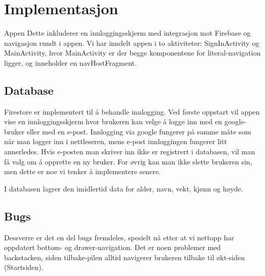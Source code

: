 \section{Implementasjon}

Appen Dette inkluderer en innloggingsskjerm med integrasjon mot Firebase og navigasjon rundt i appen. Vi har inndelt appen i to aktiviteter: SignInActivity og MainActivity, hvor MainActivity er der begge komponentene for literal-navigation ligger, og inneholder en navHostFragment. 

\subsection{Database}
Firestore er implementert til å behandle innlogging. Ved første oppstart vil appen vise en innloggingsskjerm hvor brukeren kan velge å logge inn med en google-bruker eller med en e-post. Innlogging via google fungerer på samme måte som når man logger inn i nettleseren, mens e-post innloggingen fungerer litt annerledes. Hvis e-posten man skriver inn ikke er registrert i databasen, vil man få valg om å opprette en ny bruker. For øvrig kan man ikke slette brukeren sin, men dette er noe vi tenker å implementere senere.

I databasen lagrer den imidlertid data for alder, navn, vekt, kjønn og høyde.

\subsection{Bugs}
Dessverre er det en del bugs fremdeles, spesielt nå etter at vi nettopp har oppdatert bottom- og drawer-navigation. Det er noen problemer med backstacken, siden tilbake-pilen alltid navigerer brukeren tilbake til økt-siden (Startsiden).

